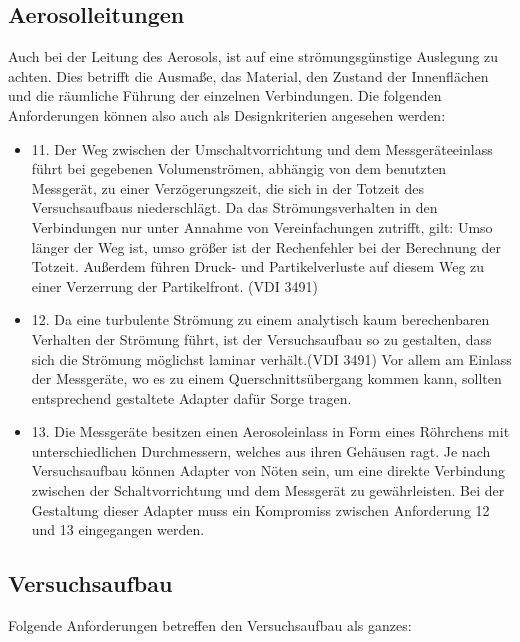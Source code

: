 \subsection{Aerosolleitungen}
Auch bei der Leitung des Aerosols, ist auf eine str\"{o}mungsg\"{u}nstige Auslegung zu achten. Dies betrifft die Ausma{\ss}e, das Material, den Zustand der Innenfl\"{a}chen und die r\"{a}umliche F\"{u}hrung der einzelnen Verbindungen. Die folgenden Anforderungen k\"{o}nnen also auch als Designkriterien angesehen werden:

\begin{itemize}
\item 11. Der Weg zwischen der Umschaltvorrichtung und dem Messger\"{a}teeinlass f\"{u}hrt bei gegebenen Volumenstr\"{o}men, abh\"{a}ngig von dem benutzten Messger\"{a}t, zu einer Verz\"{o}gerungszeit, die sich in der Totzeit des Versuchsaufbaus niederschl\"{a}gt. Da das Str\"{o}mungsverhalten in den Verbindungen nur unter Annahme von Vereinfachungen zutrifft, gilt: Umso l\"{a}nger der Weg ist, umso gr\"{o}{\ss}er ist der Rechenfehler bei der Berechnung der Totzeit. Au{\ss}erdem f\"{u}hren Druck- und Partikelverluste auf diesem Weg zu einer Verzerrung der Partikelfront. (VDI 3491)

\item 12. Da eine turbulente Str\"{o}mung zu einem analytisch kaum berechenbaren Verhalten der Str\"{o}mung f\"{u}hrt, ist der Versuchsaufbau so zu gestalten, dass sich die Str\"{o}mung m\"{o}glichst laminar verh\"{a}lt.(VDI 3491) Vor allem am Einlass der Messger\"{a}te, wo es zu einem Querschnitts\"{u}bergang kommen kann, sollten entsprechend gestaltete Adapter daf\"{u}r Sorge tragen.

\item 13. Die Messger\"{a}te besitzen einen Aerosoleinlass in Form eines R\"{o}hrchens mit unterschiedlichen Durchmessern, welches aus ihren Geh\"{a}usen ragt. Je nach Versuchsaufbau k\"{o}nnen Adapter von N\"{o}ten sein, um eine direkte Verbindung zwischen der Schaltvorrichtung und dem Messger\"{a}t zu gew\"{a}hrleisten. Bei der Gestaltung dieser Adapter muss ein Kompromiss zwischen Anforderung 12 und 13 eingegangen werden.
\end{itemize}

\subsection{Versuchsaufbau}
Folgende Anforderungen betreffen den Versuchsaufbau als ganzes:

